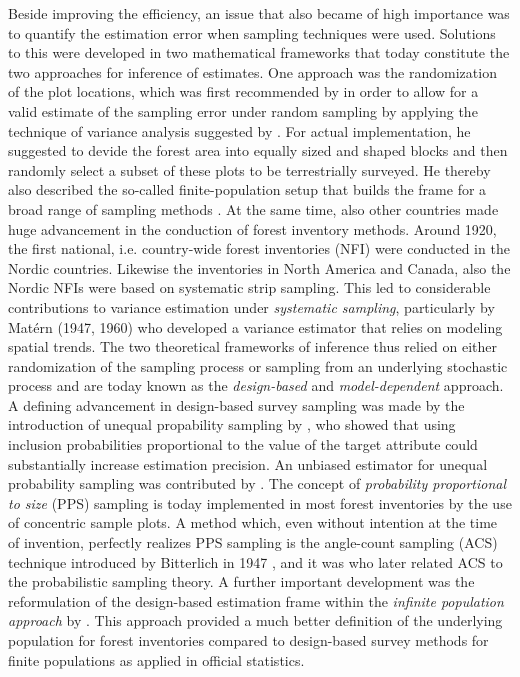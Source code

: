 Beside improving the efficiency, an issue that also became of high importance was to quantify the estimation error when sampling techniques were used. Solutions to this were developed in two mathematical frameworks that today constitute the two approaches for inference of estimates. One approach was the randomization of the plot locations, which was first recommended by \citet{hasel1938} in order to allow for a valid estimate of the sampling error under random sampling by applying the technique of variance analysis suggested by \citet{fisher1925}. For actual implementation, he suggested to devide the forest area into equally sized and shaped blocks and then randomly select a subset of these plots to be terrestrially surveyed. He thereby also described the so-called finite-population setup that builds the frame for a broad range of sampling methods \citep{schreuder1993}. At the same time, also other countries made huge advancement in the conduction of forest inventory methods. Around 1920, the first national, i.e. country-wide forest inventories (NFI) were conducted in the Nordic countries. Likewise the inventories in North America and Canada, also the Nordic NFIs were based on systematic strip sampling. This led to considerable contributions to variance estimation under \textit{systematic sampling}, particularly by Mat\'{e}rn (1947, 1960) who developed a variance estimator that relies on modeling spatial trends. The two theoretical frameworks of inference thus relied on either randomization of the sampling process or sampling from an underlying stochastic process and are today known as the \textit{design-based} and \textit{model-dependent} approach. A defining advancement in design-based survey sampling was made by the introduction of unequal propability sampling by \citet{hansen1943}, who showed that using inclusion probabilities proportional to the value of the target attribute could substantially increase estimation precision. An unbiased estimator for unequal probability sampling was contributed by \citet{horvitz1952}. The concept of \textit{probability proportional to size} (PPS) sampling is today implemented in most forest inventories by the use of concentric sample plots. A method which, even without intention at the time of invention, perfectly realizes PPS sampling is the angle-count sampling (ACS) technique introduced by Bitterlich in 1947 \citep{bitterlich1984}, and it was \citet{grosenbaugh1958} who later related ACS to the probabilistic sampling theory. A further important development was the reformulation of the design-based estimation frame within the \textit{infinite population approach} by \citet{mandallaz2008}. This approach provided a much better definition of the underlying population for forest inventories compared to design-based survey methods for finite populations as applied in official statistics.\par

